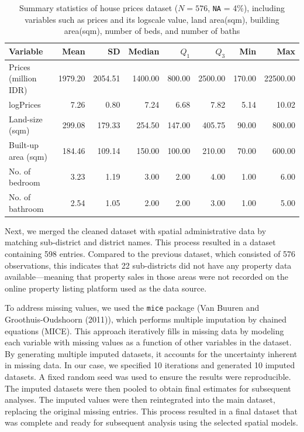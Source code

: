 \documentclass[
  default,
]{sn-jnl}
\begin{document}
\begin{longtable}[t]{lrrrrrrr}

\caption{\label{tbl-datasumm}Summary statistics of house prices dataset
(\(N = 576\), \texttt{NA} = 4\%), including variables such as prices and
its logscale value, land area(sqm), building area(sqm), number of beds,
and number of baths}

\tabularnewline

\toprule
Variable & Mean & SD & Median & $Q_1$ & $Q_3$ & Min & Max\\
\midrule
Prices (million IDR) & 1979.20 & 2054.51 & 1400.00 & 800.00 & 2500.00 & 170.00 & 22500.00\\
logPrices & 7.26 & 0.80 & 7.24 & 6.68 & 7.82 & 5.14 & 10.02\\
Land-size (sqm) & 299.08 & 179.33 & 254.50 & 147.00 & 405.75 & 90.00 & 800.00\\
Built-up area (sqm) & 184.46 & 109.14 & 150.00 & 100.00 & 210.00 & 70.00 & 600.00\\
No. of bedroom & 3.23 & 1.19 & 3.00 & 2.00 & 4.00 & 1.00 & 6.00\\
\addlinespace
No. of bathroom & 2.54 & 1.05 & 2.00 & 2.00 & 3.00 & 1.00 & 5.00\\
\bottomrule

\end{longtable}

\endgroup{}

Next, we merged the cleaned dataset with spatial administrative data by
matching sub-district and district names. This process resulted in a
dataset containing 598 entries. Compared to the previous dataset, which
consisted of 576 observations, this indicates that 22 sub-districts did
not have any property data available---meaning that property sales in
those areas were not recorded on the online property listing platform
used as the data source.

To address missing values, we used the \texttt{mice} package (Van Buuren
and Groothuis-Oudshoorn (2011)), which performs multiple imputation by
chained equations (MICE). This approach iteratively fills in missing
data by modeling each variable with missing values as a function of
other variables in the dataset. By generating multiple imputed datasets,
it accounts for the uncertainty inherent in missing data. In our case,
we specified 10 iterations and generated 10 imputed datasets. A fixed
random seed was used to ensure the results were reproducible. The
imputed datasets were then pooled to obtain final estimates for
subsequent analyses. The imputed values were then reintegrated into the
main dataset, replacing the original missing entries. This process
resulted in a final dataset that was complete and ready for subsequent
analysis using the selected spatial models.
\end{document}

